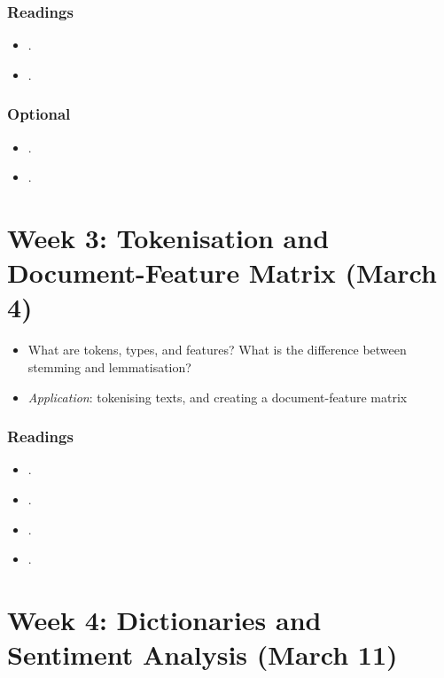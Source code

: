 \documentclass[abstract=on,parskip=full,headings=standardclasses,fontsize=11pt,paper=a4]{scrartcl}
\begin{document}
\subsubsection*{Readings}
\begin{itemize}
\item {}.
\item {}.
\end{itemize}


\subsubsection*{Optional}
\begin{itemize}
\item {}.
\item {}.
\end{itemize}

\section{Week 3:  Tokenisation and Document-Feature Matrix (March 4)}

\begin{itemize}
\renewcommand\labelitemi{--}
\item What are tokens, types, and features? What is the difference between stemming and lemmatisation?
\item \textit{Application}: tokenising texts, and creating a document-feature matrix
\end{itemize}

\subsubsection*{Readings}
\begin{itemize}
 \item {}.
 \item {}.
 \item {}.
 \item {}.
\end{itemize}
 
  
\section{Week 4: Dictionaries and Sentiment Analysis (March 11)}
\end{document}
